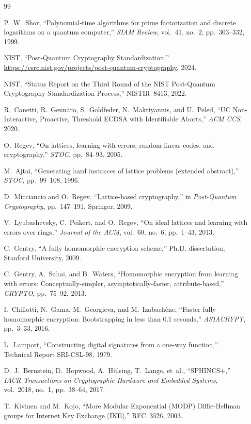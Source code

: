 \documentclass[11pt,a4paper]{article}
\begin{document}

\begin{thebibliography}{99}

P.~W.~Shor, ``Polynomial-time algorithms for prime factorization and
discrete logarithms on a quantum computer,'' \textit{SIAM Review},
vol.~41, no.~2, pp.~303--332, 1999.

NIST, ``Post-Quantum Cryptography Standardization,''
\url{https://csrc.nist.gov/projects/post-quantum-cryptography}, 2024.

NIST, ``Status Report on the Third Round of the NIST Post-Quantum
Cryptography Standardization Process,'' NISTIR~8413, 2022.

R.~Canetti, R.~Gennaro, S.~Goldfeder, N.~Makriyannis, and U.~Peled,
``UC Non-Interactive, Proactive, Threshold ECDSA with Identifiable
Aborts,'' \textit{ACM CCS}, 2020.

O.~Regev, ``On lattices, learning with errors, random linear codes,
and cryptography,'' \textit{STOC}, pp.~84--93, 2005.

M.~Ajtai, ``Generating hard instances of lattice problems (extended
abstract),'' \textit{STOC}, pp.~99--108, 1996.

D.~Micciancio and O.~Regev, ``Lattice-based cryptography,'' in
\textit{Post-Quantum Cryptography}, pp.~147--191, Springer, 2009.

V.~Lyubashevsky, C.~Peikert, and O.~Regev, ``On ideal lattices and
learning with errors over rings,'' \textit{Journal of the ACM},
vol.~60, no.~6, pp.~1--43, 2013.

C.~Gentry, ``A fully homomorphic encryption scheme,'' Ph.D.
dissertation, Stanford University, 2009.

C.~Gentry, A.~Sahai, and B.~Waters, ``Homomorphic encryption from
learning with errors: Conceptually-simpler, asymptotically-faster,
attribute-based,'' \textit{CRYPTO}, pp.~75--92, 2013.

I.~Chillotti, N.~Gama, M.~Georgieva, and M.~Izabach\`ene, ``Faster
fully homomorphic encryption: Bootstrapping in less than 0.1
seconds,'' \textit{ASIACRYPT}, pp.~3--33, 2016.

L.~Lamport, ``Constructing digital signatures from a one-way
function,'' Technical Report SRI-CSL-98, 1979.

D.~J.~Bernstein, D.~Hopwood, A.~H\"ulsing, T.~Lange, et~al.,
``SPHINCS+,'' \textit{IACR Transactions on Cryptographic Hardware
and Embedded Systems}, vol.~2018, no.~1, pp.~38--64, 2017.

T.~Kivinen and M.~Kojo, ``More Modular Exponential (MODP)
Diffie-Hellman groups for Internet Key Exchange (IKE),'' RFC~3526,
2003.

\end{thebibliography}
\end{document}
